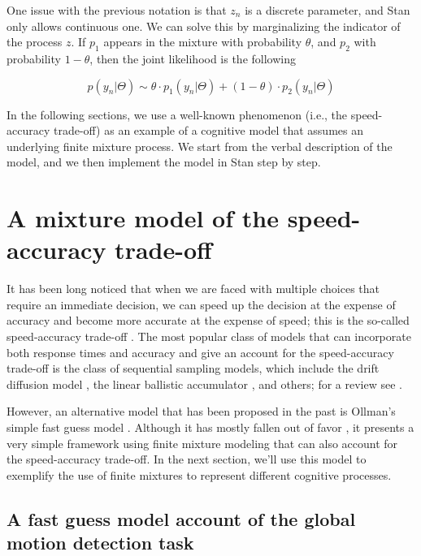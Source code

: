 \documentclass[12pt,]{krantz}
\theoremstyle{definition}
\theoremstyle{definition}
\theoremstyle{definition}
\theoremstyle{remark}
\begin{document}
One issue with the previous notation is that \(z_n\) is a discrete parameter, and Stan only allows continuous one. We can solve this by marginalizing the indicator of the process \(z\). If \(p_1\) appears in the mixture with probability \(\theta\), and \(p_2\) with probability \(1-\theta\), then the joint likelihood is the following

\begin{equation}
p(y_n | \Theta) \sim \theta \cdot p_1(y_n| \Theta) + (1-\theta) \cdot p_2(y_n | \Theta)
\end{equation}

In the following sections, we use a well-known phenomenon (i.e., the speed-accuracy trade-off) as an example of a cognitive model that assumes an underlying finite mixture process. We start from the verbal description of the model, and we then implement the model in Stan step by step.

\hypertarget{a-mixture-model-of-the-speed-accuracy-trade-off}{%
\section{A mixture model of the speed-accuracy trade-off}\label{a-mixture-model-of-the-speed-accuracy-trade-off}}

It has been long noticed that when we are faced with multiple choices that require an immediate decision, we can speed up the decision at the expense of accuracy and become more accurate at the expense of speed; this is the so-called speed-accuracy trade-off \citep{wickelgren1977speed} . The most popular class of models that can incorporate both response times and accuracy and give an account for the speed-accuracy trade-off is the class of sequential sampling models, which include the drift diffusion model \citep{Ratcliff1978}, the linear ballistic accumulator \citep{brownSimplestCompleteModel2008}, and others; for a review see \citet{Ratcliff2016}.

However, an alternative model that has been proposed in the past is Ollman's simple fast guess model \citep{Ollman1966}. Although it has mostly fallen out of favor \citep[but see][ for a more modern variant of this model]{DutilhEtAl2011}, it presents a very simple framework using finite mixture modeling that can also account for the speed-accuracy trade-off. In the next section, we'll use this model to exemplify the use of finite mixtures to represent different cognitive processes.

\hypertarget{a-fast-guess-model-account-of-the-global-motion-detection-task}{%
\subsection{A fast guess model account of the global motion detection task}\label{a-fast-guess-model-account-of-the-global-motion-detection-task}}
\end{document}

